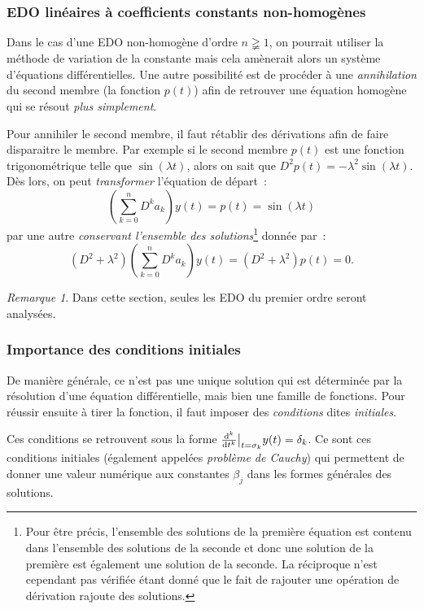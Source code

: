 \documentclass{article}
\theoremstyle{definition}
\theoremstyle{remark}
\newtheorem*{rmq}{Remarque}
\begin{document}
		\subsubsection{EDO linéaires à coefficients constants non-homogènes}

		Dans le cas d'une EDO non-homogène d'ordre $n \gneqq 1$, on pourrait utiliser la méthode de variation de la constante mais cela amènerait alors un
		système d'équations différentielles. Une autre possibilité est de procéder à une \emph{annihilation} du second membre (la fonction $p(t)$) afin de
		retrouver une équation homogène qui se résout \emph{plus simplement}.

		Pour annihiler le second membre, il faut rétablir des dérivations afin de faire disparaitre le membre. Par exemple si le second membre $p(t)$ est une
		fonction trigonométrique telle que $\sin(\lambda t)$, alors on sait que $D^2p(t) = -\lambda^2\sin(\lambda t)$. Dès lors, on peut \emph{transformer}
		l'équation de départ~:
		\[\left(\sum_{k=0}^nD^ka_k\right)y(t) = p(t) = \sin(\lambda t)\]
		par une autre \emph{conservant l'ensemble des solutions}\footnote{Pour être précis, l'ensemble des solutions de la première équation est contenu dans
		l'ensemble des solutions de la seconde et donc une solution de la première est également une solution de la seconde. La réciproque n'est cependant pas
		vérifiée étant donné que le fait de rajouter une opération de dérivation rajoute des solutions.} donnée par~:
		\[(D^2 + \lambda^2)\left(\sum_{k=0}^nD^ka_k\right)y(t) = (D^2 + \lambda^2)p(t) = 0.\]

		\begin{rmq} Dans cette section, seules les EDO du premier ordre seront analysées. \end{rmq}

		\subsubsection{Importance des conditions initiales}
		De manière générale, ce n'est pas une unique solution qui est déterminée par la résolution d'une équation différentielle, mais bien une famille de
		fonctions. Pour réussir ensuite à tirer la fonction, il faut imposer des \emph{conditions} dites \emph{initiales}.

		Ces conditions se retrouvent sous la forme $\od[k]{}t\big\rvert_{t=\sigma_k}y(t) = \delta_k$. Ce sont ces conditions initiales (également appelées
		\emph{problème de Cauchy}) qui permettent de donner une valeur numérique aux constantes $\beta_j$ dans les formes générales des solutions.
\end{document}
